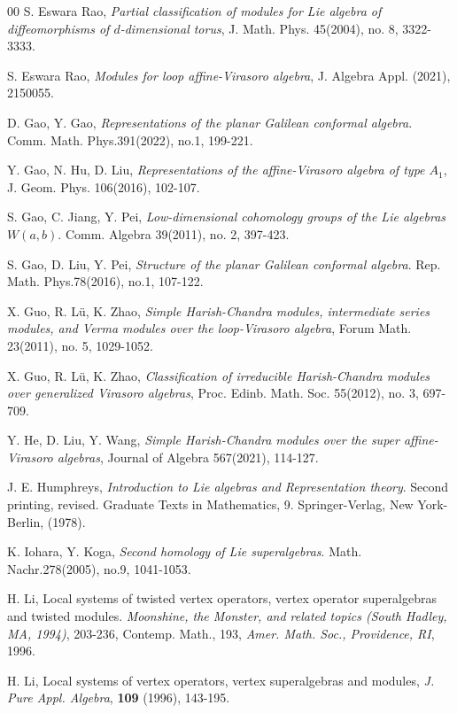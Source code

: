 \documentclass[1p]{elsarticle}
\numberwithin{equation}{section}
\begin{document}
\begin{thebibliography}{00}
 S. Eswara Rao, {\it Partial classification of modules for Lie algebra of diffeomorphisms of $d$-dimensional torus}, J. Math. Phys. 45(2004), no. 8, 3322-3333.

 S. Eswara Rao, {\it Modules for loop affine-Virasoro algebra}, J. Algebra Appl. (2021), 2150055.

 D. Gao, Y. Gao, {\it Representations of the planar Galilean conformal algebra}. Comm. Math. Phys.391(2022), no.1, 199-221.

Y. Gao, N. Hu, D. Liu, {\it Representations of the affine-Virasoro algebra of type $A_1$}, J. Geom. Phys. 106(2016), 102-107.

 S. Gao, C. Jiang, Y. Pei, {\it Low-dimensional cohomology groups of the Lie algebras $W(a,b)$}. Comm. Algebra 39(2011), no. 2, 397-423.

 S. Gao, D. Liu, Y. Pei, {\it Structure of the planar Galilean conformal algebra}. Rep. Math. Phys.78(2016), no.1, 107-122.

 X. Guo, R. L\"{u}, K. Zhao, {\it Simple Harish-Chandra modules, intermediate series modules, and Verma modules over the loop-Virasoro algebra}, Forum Math. 23(2011), no. 5, 1029-1052.

 X. Guo, R. L\"{u}, K. Zhao, {\it Classification of irreducible Harish-Chandra modules over generalized Virasoro algebras}, Proc. Edinb. Math. Soc. 55(2012), no. 3, 697-709.


Y. He, D. Liu, Y. Wang, {\it Simple Harish-Chandra modules over the super affine-Virasoro algebras}, Journal of Algebra
  567(2021),  114-127.

 J. E. Humphreys, {\it Introduction to Lie algebras and Representation theory}. Second printing, revised. Graduate Texts in Mathematics, 9. Springer-Verlag, New York-Berlin, (1978).

K. Iohara, Y. Koga, {\it Second homology of Lie superalgebras}. Math. Nachr.278(2005), no.9, 1041-1053.

H. Li,
Local systems of twisted vertex operators, vertex operator superalgebras and twisted modules. {\it Moonshine, the Monster, and related topics (South Hadley, MA, 1994)}, 203-236, Contemp. Math., 193, {\it Amer. Math. Soc., Providence, RI}, 1996.

H. Li, Local systems of vertex operators, vertex superalgebras and modules, {\it J. Pure Appl. Algebra},
{\bf 109} (1996), 143-195.


\end{thebibliography}
\end{document}

